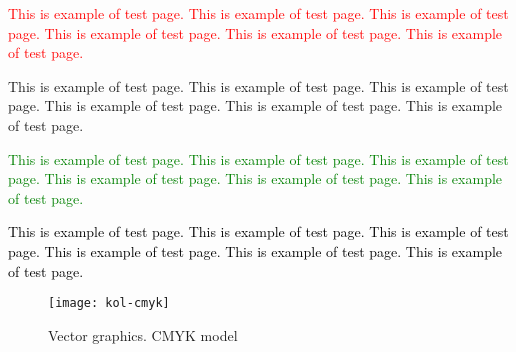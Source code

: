 \documentclass{article}
\begin{document}
\def\text{
\textcolor{red}{This is example of test page. This is example of test page.
This is example of test page. This is example of test page.
This is example of test page. This is example of test page.}\par
{\color{blue} This is example of test page. This is example of test page.
This is example of test page. This is example of test page.
This is example of test page. This is example of test page.}\par
\textcolor{green}{This is example of test page. This is example of test page.
This is example of test page. This is example of test page.
This is example of test page. This is example of test page.}\par
\textcolor{black}{This is example of test page. This is example of test page.
This is example of test page. This is example of test page.
This is example of test page. This is example of test page.}
}

\text

\begin{figure}
 \begin{center}
  \texttt{[image: kol-cmyk]}
  \caption{Vector graphics. CMYK model}
 \end{center}
\end{figure}

\end{document}
